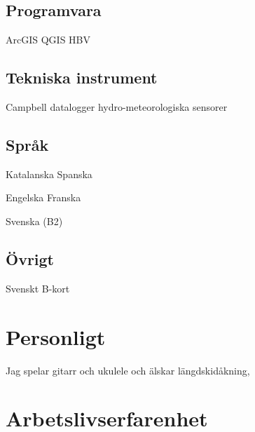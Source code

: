 \documentclass[]{gironslopez-resume-se}
\begin{document}
    \sectionsep

    \subsection{Programvara}
    ArcGIS \textbullet{} QGIS \textbullet{} HBV

    \sectionsep
    
    \subsection{Tekniska instrument}
    Campbell datalogger \textbullet{} hydro-meteorologiska sensorer
    
    \sectionsep

    \subsection{Språk}
    Katalanska \textbullet{} Spanska

    Engelska \textbullet{} Franska

    Svenska (B2)

    \sectionsep
    
    \subsection{Övrigt}
    Svenskt B-kort

    \section{Personligt}
	Jag spelar gitarr och ukulele och älskar längdskidåkning,

    \section{Arbetslivserfarenhet}
    
    
    \sectionsep
    
    
    \sectionsep
\end{document}
